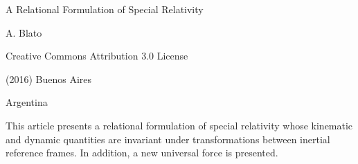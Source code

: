 \documentclass[10pt,fleqn]{article}
\begin{document}
\begin{center}

{\fontsize{10.92}{10.92}\selectfont \sc A Relational Formulation of Special Relativity}

\bigskip \medskip

{\fontsize{9.60}{9.60}\selectfont A. Blato}

\bigskip \medskip

\small

Creative Commons Attribution 3.0 License

\smallskip

(2016) Buenos Aires

\medskip

Argentina

\smallskip

\bigskip \medskip

\parbox{97.80mm}{This article presents a relational formulation of special relativity whose \hbox {kinematic} and dynamic quantities are invariant under transformations between inertial reference frames. In addition, a new universal force is presented.}

\end{center}

\normalsize

\vspace{-1.20em}

\par {}

\bigskip \smallskip
\end{document}
